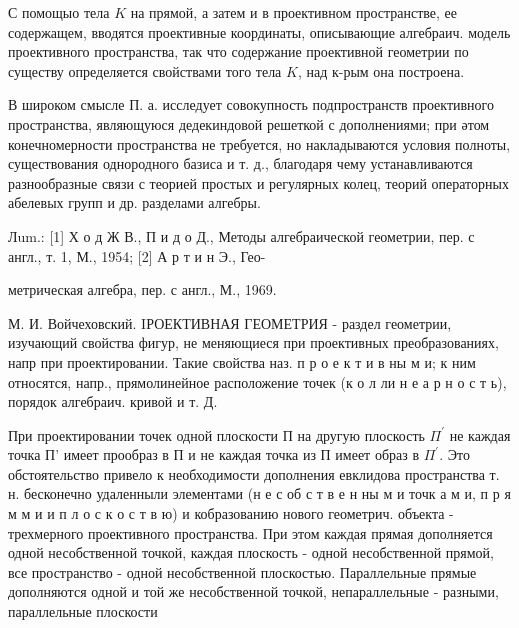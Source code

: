 \documentclass[10pt]{article}
\begin{document}
С помощыо тела $K$ на прямой, а затем и в проективном пространстве, ее содержащем, вводятся проективные координаты, описывающие алгебраич. модель проективного пространства, так что содержание проективной геометрии по существу определяется свойствами того тела $K$, над к-рым она построена.



В широком смысле П. а. исследует совокупность подпространств проективного пространства, являющуюся дедекиндовой решеткой с дополнениями; при әтом конечномерности пространства не требуется, но накладываются условия полноты, существования однородного базиса и т. д., благодаря чему устанавливаются разнообразные связи с теорией простых и регулярных колец, теорий операторных абелевых групп и др. разделами алгебры.



Лum.: [1] Х о д Ж В., П и д о Д., Методы алгебраической геометрии, пер. с англ., т. 1, М., 1954; [2] А р т и н Э., Гео-

метрическая алгебра, пер. с англ., М., 1969.



М. И. Войчеховский. IРОЕКТИВНАЯ ГЕОМЕТРИЯ - раздел геометрии, изучающий свойства фигур, не меняющиеся при проективных преобразованиях, напр при проектировании. Такие свойства наз. п р о е к т и в ны м и; к ним относятся, напр., прямолинейное расположение точек (к о л ли н е а р н о с т ь), порядок алгебраич. кривой и т. Д.



При проектировании точек одной плоскости П на другую плоскость $\Pi^{\prime}$ не каждая точка П' имеет прообраз в П и не каждая точка из П имеет образ в $\Pi^{\prime}$. Это обстоятельство привело к необходимости дополнения евклидова пространства т. н. бесконечно удаленныли элементами (н е с об с т в е н ны м и точк а м и, п р я м м и и п л о с к о с т в ю) и кобразованию нового геометрич. объекта - трехмерного проективного пространства. При этом каждая прямая дополняется одной несобственной точкой, каждая плоскость - одной несобственной прямой, все пространство - одной несобственной плоскостью. Параллельные прямые дополняются одной и той же несобственной точкой, непараллельные - разными, параллельные плоскости
\end{document}
